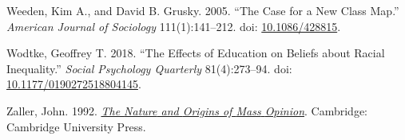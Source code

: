 \documentclass[
  12pt,
]{article}
\newlength{\cslhangindent}
\newlength{\cslentryspacingunit} %
\newenvironment{CSLReferences}[2] %
 {%
  \setlength{\parindent}{0pt}
  \ifodd #1
  \let\oldpar\par
  \def\par{\hangindent=\cslhangindent\oldpar}
  \fi
  \setlength{\parskip}{#2\cslentryspacingunit}
 }%
 {}
\begin{document}
\begin{CSLReferences}{1}{0}
\leavevmode{}%
Weeden, Kim A., and David B. Grusky. 2005. {``The {Case} for a {New}
{Class} {Map}.''} \emph{American Journal of Sociology} 111(1):141--212.
doi: \href{https://doi.org/10.1086/428815}{10.1086/428815}.

\leavevmode{}%
Wodtke, Geoffrey T. 2018. {``The {Effects} of {Education} on {Beliefs}
about {Racial} {Inequality}.''} \emph{Social Psychology Quarterly}
81(4):273--94. doi:
\href{https://doi.org/10.1177/0190272518804145}{10.1177/0190272518804145}.

\leavevmode{}%
Zaller, John. 1992.
\emph{\href{https://doi.org/10.1017/CBO9780511818691}{The {Nature} and
{Origins} of {Mass} {Opinion}}}. Cambridge: Cambridge University Press.

\end{CSLReferences}
\end{document}
